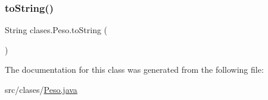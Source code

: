 \mbox{\label{classclases_1_1_peso_a141d91b62bd2ad4d18e263b2042d6368}} 
\subsubsection{\texorpdfstring{to\+String()}{toString()}}
{\footnotesize\ttfamily String clases.\+Peso.\+to\+String (\begin{DoxyParamCaption}{ }\end{DoxyParamCaption})}



The documentation for this class was generated from the following file\+:\begin{DoxyCompactItemize}
\item 
src/clases/\mbox{\hyperlink{_peso_8java}{Peso.\+java}}\end{DoxyCompactItemize}
